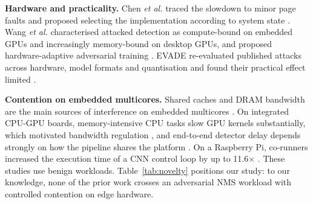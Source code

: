 \documentclass[conference]{IEEEtran}
\begin{document}
\textbf{Hardware and practicality.} Chen \emph{et al.} traced the slowdown to minor page faults
and proposed selecting the implementation according to system state \cite{chen2024resilience}.
Wang \emph{et al.} characterised attacked detection as compute-bound on embedded GPUs and
increasingly memory-bound on desktop GPUs, and proposed hardware-adaptive adversarial training
\cite{wang2025cantslow}. EVADE re-evaluated published attacks across hardware, model formats and
quantisation and found their practical effect limited \cite{monteuuis2025evade}.

\textbf{Contention on embedded multicores.} Shared caches and DRAM bandwidth are the main sources
of interference on embedded multicores \cite{valsan2016isolbench}. On integrated CPU-GPU boards,
memory-intensive CPU tasks slow GPU kernels substantially, which motivated bandwidth regulation
\cite{ali2018bwlock}, and end-to-end detector delay depends strongly on how the pipeline shares
the platform \cite{jang2020rtod}. On a Raspberry Pi, co-runners increased the execution time of a
CNN control loop by up to 11.6$\times$ \cite{bechtel2018deeppicar}. These studies use benign
workloads. Table~\ref{tab:novelty} positions our study: to our knowledge, none of the prior work
crosses an adversarial NMS workload with controlled contention on edge hardware.

\begin{table}[t]
\caption{Closest prior work.}
\label{tab:novelty}
\centering\footnotesize
{}
\end{table}

\end{document}
